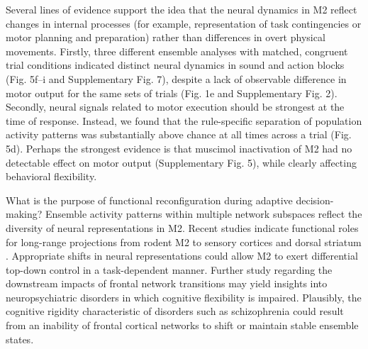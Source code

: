 Several lines of evidence support the idea that the neural dynamics in M2 reflect changes in internal processes (for example, representation of task contingencies or motor planning and preparation) rather than differences in overt physical movements. Firstly, three different ensemble analyses with matched, congruent trial conditions indicated distinct neural dynamics in sound and action blocks (Fig. 5f–i and Supplementary Fig. 7), despite a lack of observable difference in motor output for the same sets of trials (Fig. 1e and Supplementary Fig. 2). Secondly, neural signals related to motor execution should be strongest at the time of response. Instead, we found that the rule-specific separation of population activity patterns was substantially above chance at all times across a trial (Fig. 5d). Perhaps the strongest evidence is that muscimol inactivation of M2 had no detectable effect on motor output (Supplementary Fig. 5), while clearly affecting behavioral flexibility.

What is the purpose of functional reconfiguration during adaptive decision-making? Ensemble activity patterns within multiple network subspaces reflect the diversity of neural representations in M2. Recent studies indicate functional roles for long-range projections from rodent M2 to sensory cortices \citep{schneider2014synaptic,manita2015top} and dorsal striatum \citep{rothwell2015input}. Appropriate shifts in neural representations could allow M2 to exert differential top-down control in a task-dependent manner. Further study regarding the downstream impacts of frontal network transitions may yield insights into neuropsychiatric disorders in which cognitive flexibility is impaired. Plausibly, the cognitive rigidity characteristic of disorders such as schizophrenia could result from an inability of frontal cortical networks to shift or maintain stable ensemble states.